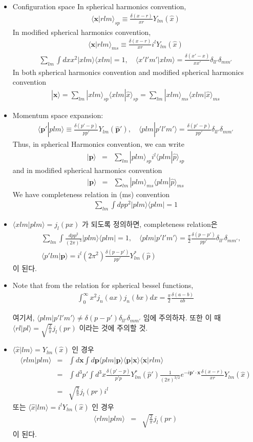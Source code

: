 \documentclass[10pt]{book}
\def\bm{\boldsymbol}
\newcommand{\bea}{\begin{eqnarray}}
\newcommand{\eea}{\end{eqnarray}}
\newcommand{\no}{\nonumber \\}
\def\vp{{\bm p}}
\def\vx{{\bm x}}
\def\la{\langle}
\def\ra{\rangle}
\begin{document}
\begin{itemize}

\item Configuration space
In spherical harmonics convention,
\bea
\la \vx| r l m\ra_{sp}\equiv 
\frac{\delta(x-r)}{xr} Y_{lm}(\hat{x})
\eea
In modified spherical harmonics convention,
\bea
\la \vx| r l m\ra_{ms}\equiv 
\frac{\delta(x-r)}{xr} i^l Y_{lm}(\hat{x})
\eea
\bea
\sum_{lm}\int dx x^2 | xlm\ra \la x lm|=1 ,\quad 
\la x' l' m'| x lm\ra=\frac{\delta(x'-x)}{xx'}\delta_{ll'}\delta_{mm'}
\eea
In both spherical harmonics convention and 
modified spherical harmonics convention
\bea
|\vx\ra=\sum_{lm} |x lm\ra_{sp} \la x lm|\hat{x}\ra_{sp}
=\sum_{lm} |x lm\ra_{ms} \la x lm|\hat{x}\ra_{ms}         
\eea

\item Momentum space expansion: 
\bea
\la \vp'|p l m\ra\equiv \frac{\delta(p'-p)}{p p'}Y_{lm}(\hat{\vp}'),
\quad \la p lm |p'l'm'\ra=\frac{\delta(p'-p)}{p p'}\delta_{ll'}\delta_{mm'}
\eea
Thus, in spherical Harmonics convention, we 
can write
\bea
|\vp\ra&=&\sum_{lm} |p lm\ra_{sp} i^l \la plm|\hat{p}\ra_{sp}
\eea
and in modified spherical harmonics convention
\bea
|\vp\ra&=&\sum_{lm} |p lm\ra_{ms} \la plm|\hat{p}\ra_{ms}
\eea
We have completeness relation in (ms) convention 
\bea
\sum_{lm}\int dp p^2 |p lm\ra \la p lm|
=1
\eea

\item 
$\la x lm|p lm\ra=j_l(px) $ 가 되도록 정의하면, 
completeness relation은
\bea
& &\sum_{lm}\int \frac{dp p^2}{(2\pi)^3} |p lm\ra \la p lm| =1,\quad
  \la p lm|p' l' m'\ra= \frac{\pi}{2}
     \frac{\delta(p-p')}{pp'}\delta_{ll'}\delta_{mm'},\no
& &\la p' lm|\vp\ra= i^l (2\pi^2)\frac{\delta(p-p')}{ pp'}Y^*_{lm}(\hat{p})
\eea 
이 된다. 

\item  
Note that from the relation for spherical bessel functions,
\bea
\boxed{
\int_0^\infty x^2 j_n(a x) j_n(b x)dx
=\frac{\pi}{2}\frac{\delta(a-b)}{ab}}
\eea

여기서, $\la p lm|p' l' m'\ra\neq \delta(p-p')\delta_{ll'}\delta_{mm'}$ 임에 주의하자.
또한 이 때 $\la rl|p l\ra=\sqrt{\frac{2}{\pi}}j_l(pr)$ 이라는
것에 주의할 것.


\item
$\la \hat{x}|lm\ra=Y_{lm}(\hat{x})$ 인 경우
\bea
\la r lm|p lm\ra
&=&\int d\vx \int d \vp \la p lm|\vp\ra\la \vp|\vx\ra\la \vx|r lm\ra\no 
&=&\int d^3 p'\int d^3 x\frac{\delta(p'-p)}{p'p}Y^*_{lm}(\hat{p}')
                          \frac{1}{(2\pi)^{3/2}}e^{-i\vp'\cdot\vx}
                          \frac{\delta(x-r)}{xr}Y_{lm}(\hat{x})\no
                      &=&\sqrt{\frac{2}{\pi}}j_l(pr)i^l 
\eea
또는 $\la \hat{x}|lm\ra=i^ l Y_{lm}(\hat{x})$ 인 경우
\bea
\la r lm|p lm\ra &=&\sqrt{\frac{2}{\pi}}j_l(pr) 
\eea
이 된다.


\end{itemize}
\end{document}
